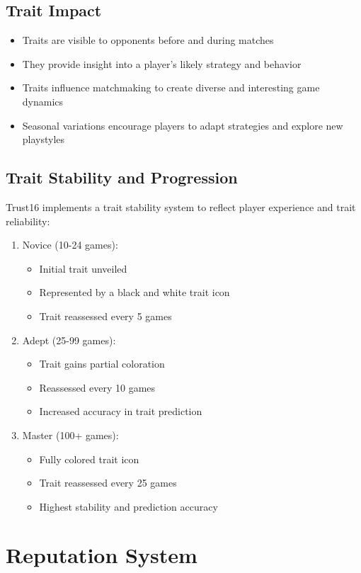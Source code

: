 \documentclass[12pt,a4paper]{article}
\begin{document}
\subsection{Trait Impact}
\begin{itemize}
  \item Traits are visible to opponents before and during matches
  \item They provide insight into a player's likely strategy and behavior
  \item Traits influence matchmaking to create diverse and interesting game dynamics
  \item Seasonal variations encourage players to adapt strategies and explore new playstyles
\end{itemize}

\subsection{Trait Stability and Progression}
Trust16 implements a trait stability system to reflect player experience and trait reliability:
\begin{enumerate}
  \item Novice (10-24 games):
  \begin{itemize}
      \item Initial trait unveiled
      \item Represented by a black and white trait icon
      \item Trait reassessed every 5 games
  \end{itemize}
  \item Adept (25-99 games):
  \begin{itemize}
      \item Trait gains partial coloration
      \item Reassessed every 10 games
      \item Increased accuracy in trait prediction
  \end{itemize}
  \item Master (100+ games):
  \begin{itemize}
      \item Fully colored trait icon
      \item Trait reassessed every 25 games
      \item Highest stability and prediction accuracy
  \end{itemize}
\end{enumerate}

\section{Reputation System}
\end{document}

